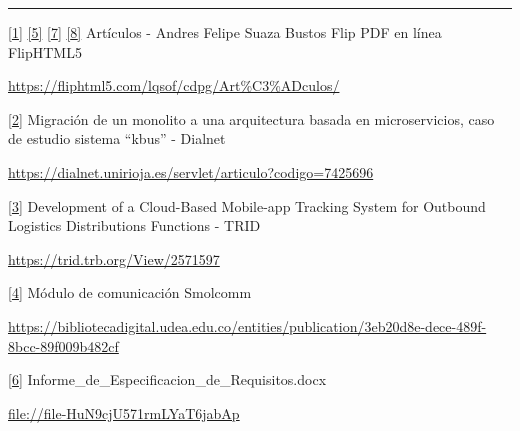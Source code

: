 \documentclass[
]{article}
\begin{document}
\begin{center}\rule{0.5\linewidth}{0.5pt}\end{center}

\href{https://fliphtml5.com/lqsof/cdpg/Art\%C3\%ADculos/\#:~:text=permitiendo\%20un\%20flujo\%20de\%20datos,del\%20sistema\%20fue\%20un\%20rigurosa}{{[}1{]}}
\href{https://fliphtml5.com/lqsof/cdpg/Art\%C3\%ADculos/\#:~:text=sistema,a\%206\%20metros\%2C\%20una\%20latencia}{{[}5{]}}
\href{https://fliphtml5.com/lqsof/cdpg/Art\%C3\%ADculos/\#:~:text=librer\%C3\%ADas\%20externas\%20para\%20muchos\%20componentes,tener\%20un\%20rendimiento\%20menor\%20en}{{[}7{]}}
\href{https://fliphtml5.com/lqsof/cdpg/Art\%C3\%ADculos/\#:~:text=potentes\%20y\%20de\%20c\%C3\%B3digo\%20abierto\%2C,cuanto\%20al\%20tiempo\%20de\%20creaci\%C3\%B3n}{{[}8{]}}
Artículos - Andres Felipe Suaza Bustos \textbar{} Flip PDF en línea
\textbar{} FlipHTML5

\url{https://fliphtml5.com/lqsof/cdpg/Art\%C3\%ADculos/}

\href{https://dialnet.unirioja.es/servlet/articulo?codigo=7425696\#:~:text=,monolito\%20previo\%20se\%20encontraba\%20en}{{[}2{]}}
Migración de un monolito a una arquitectura basada en microservicios,
caso de estudio sistema ``kbus'' - Dialnet

\url{https://dialnet.unirioja.es/servlet/articulo?codigo=7425696}

\href{https://trid.trb.org/View/2571597\#:~:text=efficiency\%20for\%20product\%20delivery,for\%20server\%20setup\%2C\%20Docker\%2C\%20and}{{[}3{]}}
Development of a Cloud-Based Mobile-app Tracking System for Outbound
Logistics Distributions Functions - TRID

\url{https://trid.trb.org/View/2571597}

\href{https://bibliotecadigital.udea.edu.co/entities/publication/3eb20d8e-dece-489f-8bcc-89f009b482cf\#:~:text=entre\%20las\%20m\%C3\%A1quinas\%20y\%20el,logrando\%20as\%C3\%AD\%20una\%20comunicaci\%C3\%B3n\%20bidireccional}{{[}4{]}}
Módulo de comunicación Smolcomm

\url{https://bibliotecadigital.udea.edu.co/entities/publication/3eb20d8e-dece-489f-8bcc-89f009b482cf}

\href{file://file-HuN9cjU571rmLYaT6jabAp\#:~:text=,2\%20segundos\%20tras\%20su\%20recepci\%C3\%B3n}{{[}6{]}}
Informe\_de\_Especificacion\_de\_Requisitos.docx

\url{file://file-HuN9cjU571rmLYaT6jabAp}
\end{document}

